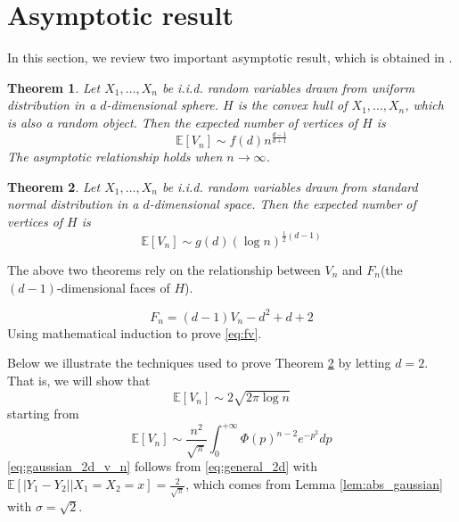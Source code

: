 \documentclass{article}
\newtheorem{theorem}{Theorem}
\def\E{\mathbb{E}}
\begin{document}
\section{Asymptotic result}
In this section, we review two important asymptotic result,
which is obtained in \cite{raynaud1970enveloppe}.
\begin{theorem}
    Let $X_1, \dots, X_n$ be i.i.d. random variables
    drawn from uniform distribution in a $d$-dimensional sphere.
    $H$ is the convex hull of $X_1, \dots, X_n$, which is also
    a random object.
    Then the expected number of vertices of $H$ is
    \begin{equation}
    \E[V_n] \sim f(d)n^{\frac{d-1}{d+1}}
    \end{equation}
    The asymptotic relationship holds when $n\to \infty$.
\end{theorem}
\begin{theorem}\label{thm:x1xnvn}
    Let $X_1, \dots, X_n$ be i.i.d. random variables
    drawn from standard normal distribution in a $d$-dimensional space.
    Then the expected number of vertices of $H$ is
    \begin{equation}
    \E[V_n] \sim g(d) (\log n)^{\frac{1}{2}(d-1)}
    \end{equation}
\end{theorem}
The above two theorems rely on the relationship between
$V_n$ and $F_n$(the $(d-1)$-dimensional faces of $H$).

\begin{equation}\label{eq:fv}
    F_n = (d-1) V_n - d^2 + d + 2
\end{equation}
Using mathematical induction to prove
\eqref{eq:fv}.

Below we illustrate the techniques used to prove Theorem
\ref{thm:x1xnvn} by letting $d=2$.
That is, we will show that
\begin{equation}\label{eq:gaussian_2d_evn}
    \E[V_n] \sim 2\sqrt{2\pi \log n}
\end{equation}
starting from
\begin{equation}\label{eq:gaussian_2d_v_n}
    \E[V_n] \sim \frac{n^2}{\sqrt{\pi}}
    \int_{0}^{+\infty} \Phi(p)^{n-2}e^{-p^2}dp
\end{equation}
\eqref{eq:gaussian_2d_v_n} follows
from \eqref{eq:general_2d} with
$\E[|Y_1-Y_2| \Big\vert X_1=X_2=x] = \frac{2}{\sqrt{\pi}}$,
which comes from Lemma \ref{lem:abs_gaussian} with $\sigma=\sqrt{2}$.
\end{document}
